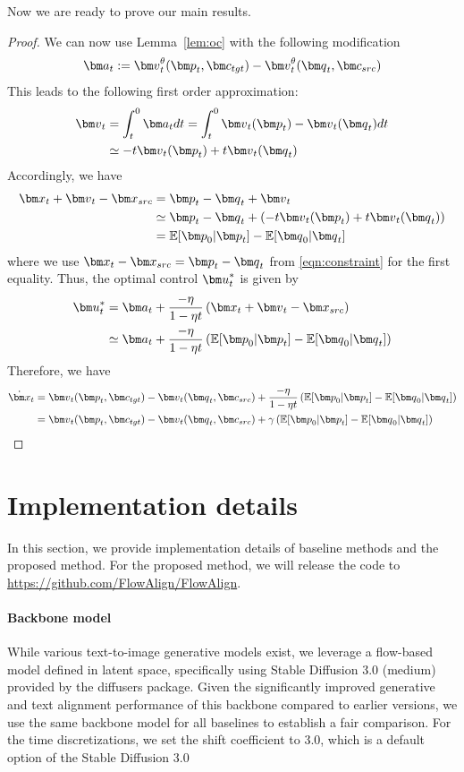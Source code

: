 Now we are ready to prove our main results.
\rectflow*
\begin{proof}
We can now use  Lemma~\ref{lem:oc} with the following modification
\begin{align}
\va_t := \vv_t^\theta(\vp_t, \vc_{tgt}) - \vv_t^\theta(\vq_t, \vc_{src}) 
\end{align}
This leads to  the following first order approximation:
\begin{align}
\vv_{t}  &= \int_t^0 \va_t dt =  \int_t^0 \vv_t(\vp_t) -\vv_t(\vq_t) dt \\
&\simeq -t \vv_t(\vp_t) + t \vv_t (\vq_t)
\end{align}
Accordingly, we have
\begin{align*}
\vx_{t}+\vv_{t} -\vx_{src}   &= \vp_t-\vq_t  +\vv_t \notag\\
&\simeq  \vp_t-\vq_t + (-t \vv_t(\vp_t) + t \vv_t (\vq_t))  \\
&=\mathbb{E}[\vp_0|\vp_t]-\mathbb{E}[\vq_0|\vq_t]
\end{align*}
where we use  $\vx_{t} -\vx_{src} = \vp_t-\vq_t $ from \eqref{eqn:constraint} for the first
equality. 
Thus, the optimal control  $\vu_t^*$ is given by
\begin{align}
\vu_t^* 
&=  \va_t + \frac{-\eta}{1-\eta t} \left(\vx_{t}+\vv_{t} -\vx_{src} \right) \notag\\
&\simeq  \va_t +\frac{-\eta}{1-\eta t}\left(\mathbb{E}[\vp_0|\vp_t]-\mathbb{E}[\vq_0|\vq_t]\right) 
\end{align}
Therefore, we have
\begin{align}
\dot \vx_t &= \vv_t(\vp_t, \vc_{tgt}) - \vv_t(\vq_t, \vc_{src}) +\frac{-\eta}{1-\eta t} \left(\mathbb{E}[\vp_0|\vp_t]-\mathbb{E}[\vq_0|\vq_t]\right)\\
&= \vv_t(\vp_t, \vc_{tgt}) - \vv_t(\vq_t, \vc_{src}) +\gamma \left(\mathbb{E}[\vp_0|\vp_t]-\mathbb{E}[\vq_0|\vq_t]\right)
\label{eqn:final_drift}
\end{align}

\end{proof}

\section{Implementation details}
\label{sec:details}
In this section, we provide implementation details of baseline methods and the proposed method. For the proposed method, we will release the code to \url{https://github.com/FlowAlign/FlowAlign}.

\paragraph{Backbone model}
While various text-to-image generative models exist, we leverage a flow-based model defined in latent space, specifically using Stable Diffusion 3.0 (medium)~\cite{esser2024scaling} provided by the diffusers package.
Given the significantly improved generative and text alignment performance of this backbone compared to earlier versions, we use the same backbone model for all baselines to establish a fair comparison.
For the time discretizations, we set the shift coefficient to 3.0, which is a default option of the Stable Diffusion 3.0

